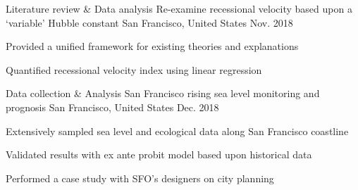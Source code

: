 \begin{cventries}
  \cventry
    {Literature review \& Data analysis}
    {Re-examine recessional velocity based upon a `variable' Hubble constant}
    {San Francisco, United States}
    {Nov. 2018}
    {
      \begin{cvitems}
        \item {Provided a unified framework for existing theories and explanations}
        \item {Quantified recessional velocity index using linear regression}
      \end{cvitems}
    }

  \cventry
    {Data collection \& Analysis}
    {San Francisco rising sea level monitoring and prognosis}
    {San Francisco, United States}
    {Dec. 2018}
    {
      \begin{cvitems}
        \item {Extensively sampled sea level and ecological data along San Francisco coastline}
        \item {Validated results with ex ante probit model based upon historical data}
        \item {Performed a case study with SFO's designers on city planning}
      \end{cvitems}
    }
\end{cventries}
